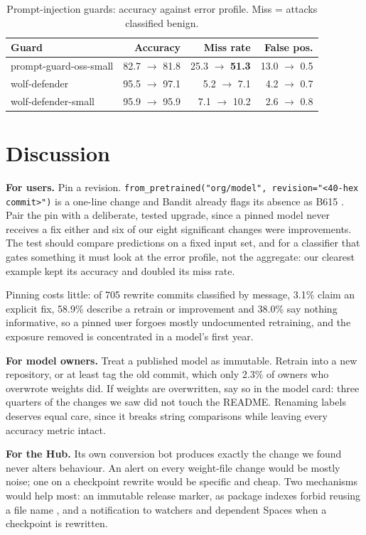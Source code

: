 \documentclass[conference]{IEEEtran}
\newcommand{\code}[1]{\texttt{#1}}
\begin{document}
\begin{table}[t]
\caption{Prompt-injection guards: accuracy against error profile. Miss = attacks classified benign.}
\label{tab:guards}
\centering
\footnotesize
\begin{tabular}{lrrr}
\toprule
Guard & Accuracy & Miss rate & False pos. \\
\midrule
prompt-guard-oss-small & 82.7 $\to$ 81.8 & 25.3 $\to$ \textbf{51.3} & 13.0 $\to$ 0.5 \\
wolf-defender & 95.5 $\to$ 97.1 & 5.2 $\to$ 7.1 & 4.2 $\to$ 0.7 \\
wolf-defender-small & 95.9 $\to$ 95.9 & 7.1 $\to$ 10.2 & 2.6 $\to$ 0.8 \\
\bottomrule
\end{tabular}
\end{table}

\section{Discussion}

\textbf{For users.} Pin a revision. \code{from\_pretrained("org/model", revision="<40-hex commit>")} is a one-line change and Bandit already flags its absence as B615 \cite{bandit-b615}. Pair the pin with a deliberate, tested upgrade, since a pinned model never receives a fix either and six of our eight significant changes were improvements. The test should compare predictions on a fixed input set, and for a classifier that gates something it must look at the error profile, not the aggregate: our clearest example kept its accuracy and doubled its miss rate.

Pinning costs little: of 705 rewrite commits classified by message, 3.1\% claim an explicit fix, 58.9\% describe a retrain or improvement and 38.0\% say nothing informative, so a pinned user forgoes mostly undocumented retraining, and the exposure removed is concentrated in a model's first year.

\textbf{For model owners.} Treat a published model as immutable. Retrain into a new repository, or at least tag the old commit, which only 2.3\% of owners who overwrote weights did. If weights are overwritten, say so in the model card: three quarters of the changes we saw did not touch the README. Renaming labels deserves equal care, since it breaks string comparisons while leaving every accuracy metric intact.

\textbf{For the Hub.} Its own conversion bot produces exactly the change we found never alters behaviour. An alert on every weight-file change would be mostly noise; one on a checkpoint rewrite would be specific and cheap. Two mechanisms would help most: an immutable release marker, as package indexes forbid reusing a file name \cite{pypi-reuse}, and a notification to watchers and dependent Spaces when a checkpoint is rewritten.
\end{document}
